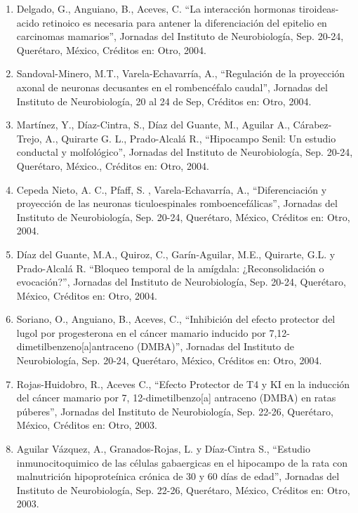 \begin{enumerate}
\item Delgado, G., Anguiano, B., Aceves, C. “La interacción hormonas tiroideas-acido retinoico es necesaria para antener la diferenciación del epitelio en 
carcinomas 
mamarios”, Jornadas del Instituto de Neurobiología, Sep. 20-24, Querétaro, México, Créditos en: Otro, 2004.

\item Sandoval-Minero, M.T., Varela-Echavarría, A., “Regulación de la proyección axonal de neuronas decusantes en el rombencéfalo caudal”, Jornadas del Instituto 
de 
Neurobiología, 20 al 24 de Sep, Créditos en: Otro, 2004.

\item Martínez, Y., Díaz-Cintra, S., Díaz del Guante, M., Aguilar A., Cárabez-Trejo, A., Quirarte G. L., Prado-Alcalá R., “Hipocampo Senil: Un estudio conductal 
y 
molfológico”, Jornadas del Instituto de Neurobiología, Sep. 20-24, Querétaro, México., Créditos en: Otro, 2004.

\item Cepeda Nieto, A. C., Pfaff, S. , Varela-Echavarría, A., “Diferenciación y proyección de las neuronas ticuloespinales romboencefálicas”, Jornadas del 
Instituto de 
Neurobiología, Sep. 20-24, Querétaro, México, Créditos en: Otro, 2004.

\item Díaz del Guante, M.A., Quiroz, C., Garín-Aguilar, M.E., Quirarte, G.L. y Prado-Alcalá R. “Bloqueo temporal de la amígdala: ¿Reconsolidación o evocación?”, 
Jornadas del Instituto de Neurobiología, Sep. 20-24, Querétaro, México, Créditos en: Otro, 2004.

\item Soriano, O., Anguiano, B., Aceves, C., “Inhibición del efecto protector del lugol por progesterona en el cáncer mamario inducido por 
7,12-dimetilbenzeno[a]antraceno (DMBA)”, Jornadas del Instituto de Neurobiología, Sep. 20-24, Querétaro, México, Créditos en: Otro, 2004.

\item Rojas-Huidobro, R., Aceves C., “Efecto Protector de T4 y KI en la inducción del cáncer mamario por 7, 12-dimetilbenzo[a] antraceno (DMBA) en ratas 
púberes”, 
Jornadas del Instituto de Neurobiología, Sep. 22-26, Querétaro, México, Créditos en: Otro, 2003.

\item Aguilar Vázquez, A., Granados-Rojas, L. y Díaz-Cintra S., “Estudio inmunocitoquimico de las células gabaergicas en el hipocampo de la rata con malnutrición 
hipoproteínica crónica de 30 y 60 días de edad”, Jornadas del Instituto de Neurobiología, Sep. 22-26, Querétaro, México, Créditos en: Otro, 2003.


\end{enumerate}
